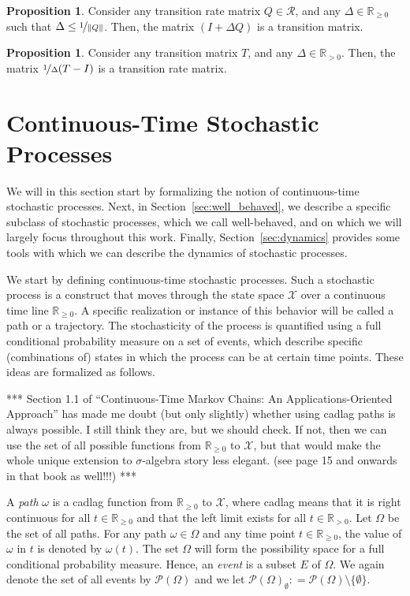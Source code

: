 \documentclass[10pt]{paper}
\theoremstyle{definition}
\newtheorem{proposition}[theorem]{Proposition}
\newcommand{\reals}{\mathbb{R}}
\newcommand{\realspos}{\reals_{>0}}
\newcommand{\realsnonneg}{\reals_{\geq 0}}
\newcommand{\states}{\mathcal{X}}
\newcommand{\paths}{\Omega}
\newcommand{\power}{\mathcal{P}(\paths)}
\newcommand{\nonemptypower}{\power_{\emptyset}}
\newcommand{\norm}[1]{\left\lVert #1 \right\rVert}
\newcommand{\coloneqq}{:\!=}
\begin{document}
\begin{proposition}\label{prop:stochastic_from_rate_matrix}
Consider any transition rate matrix $Q\in\mathcal{R}$, and any $\Delta\in\realsnonneg$ such that $\Delta \leq \nicefrac{1}{\norm{Q}}$. Then, the matrix $(I+\Delta Q)$ is a transition matrix.
\end{proposition}

\begin{proposition}\label{prop:rate_from_stochastic_matrix}
Consider any transition matrix $T$, and any $\Delta\in\realspos$. Then, the matrix $\nicefrac{1}{\Delta}(T-I)$ is a transition rate matrix.
\end{proposition}

\section{Continuous-Time Stochastic Processes}\label{sec:stochastic_processes}

We will in this section start by formalizing the notion of continuous-time stochastic processes. Next, in Section~\ref{sec:well_behaved}, we describe a specific subclass of stochastic processes, which we call well-behaved, and on which we will largely focus throughout this work. Finally, Section~\ref{sec:dynamics} provides some tools with which we can describe the dynamics of stochastic processes.

We start by defining continuous-time stochastic processes. Such a stochastic process is a construct that moves through the state space $\states$ over a continuous time line $\realsnonneg$. A specific realization or instance of this behavior will be called a path or a trajectory. The stochasticity of the process is quantified using a full conditional probability measure on a set of events, which describe specific (combinations of) states in which the process can be at certain time points. These ideas are formalized as follows.

*** Section 1.1 of ``Continuous-Time Markov Chains: An Applications-Oriented Approach'' has made me doubt (but only slightly) whether using cadlag paths is always possible. I still think they are, but we should check. If not, then we can use the set of all possible functions from $\realsnonneg$ to $\states$, but that would make the whole unique extension to $\sigma$-algebra story less elegant. (see page 15 and onwards in that book as well!!!) ***

A \emph{path} $\omega$ is a cadlag function from $\realsnonneg$ to $\states$, where cadlag means that it is right continuous for all $t\in\realsnonneg$ and that the left limit exists for all $t\in\realspos$. Let $\paths$ be the set of all paths. For any path $\omega\in\paths$ and any time point $t\in\realsnonneg$, the value of $\omega$ in $t$ is denoted by $\omega(t)$. The set $\Omega$ will form the possibility space for a full conditional probability measure. Hence, an \emph{event} is a subset $E$ of $\paths$. We again denote the set of all events by $\power$ and we let $\nonemptypower\coloneqq\power\setminus\{\emptyset\}$. 
\end{document}
